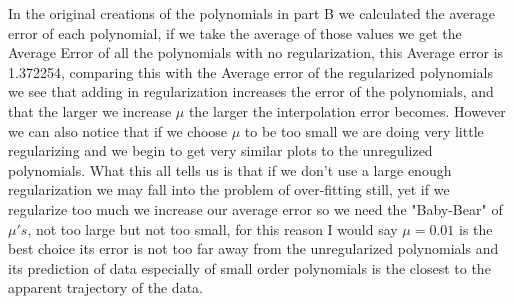 \documentclass{report}
\begin{document}
In the original creations of the polynomials in part B we calculated the average error of each polynomial, if we take the average of those values we get the Average Error of all the polynomials with no regularization, this Average error is 1.372254, comparing this with the Average error of the regularized polynomials we see that adding in regularization increases the error of the polynomials, and that the larger we increase $\mu$ the larger the interpolation error becomes. However we can also notice that if we choose $\mu$ to be too small we are doing very little regularizing and we begin to get very similar plots to the unregulized polynomials. What this all tells us is that if we don't use a large enough regularization we may fall into the problem of over-fitting still, yet if we regularize too much we increase our average error so we need the "Baby-Bear" of $\mu's$, not too large but not too small, for this reason I would say $\mu=0.01$ is the best choice its error is not too far away from the unregularized polynomials and its prediction of data especially of small order polynomials is the closest to the apparent trajectory of the data.
\end{document}
